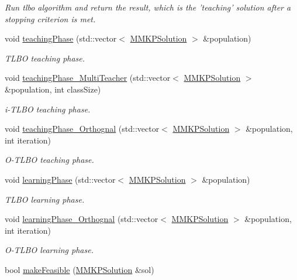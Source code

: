 \begin{DoxyCompactItemize}
\begin{DoxyCompactList}\small\item\em Run tlbo algorithm and return the result, which is the 'teaching' solution after a stopping criterion is met. \end{DoxyCompactList}\item 
void \hyperlink{class_m_m_k_p___t_l_b_o_ab18aa71ce62a00663cedb6d7d8db6f38}{teaching\+Phase} (std\+::vector$<$ \hyperlink{class_m_m_k_p_solution}{M\+M\+K\+P\+Solution} $>$ \&population)
\begin{DoxyCompactList}\small\item\em T\+L\+B\+O teaching phase. \end{DoxyCompactList}\item 
void \hyperlink{class_m_m_k_p___t_l_b_o_a0d3fe3e2570a79a3bd2f29aef3977d7e}{teaching\+Phase\+\_\+\+Multi\+Teacher} (std\+::vector$<$ \hyperlink{class_m_m_k_p_solution}{M\+M\+K\+P\+Solution} $>$ \&population, int class\+Size)
\begin{DoxyCompactList}\small\item\em i-\/\+T\+L\+B\+O teaching phase. \end{DoxyCompactList}\item 
void \hyperlink{class_m_m_k_p___t_l_b_o_a6377147784c758b4f8e782b37f86be73}{teaching\+Phase\+\_\+\+Orthognal} (std\+::vector$<$ \hyperlink{class_m_m_k_p_solution}{M\+M\+K\+P\+Solution} $>$ \&population, int iteration)
\begin{DoxyCompactList}\small\item\em O-\/\+T\+L\+B\+O teaching phase. \end{DoxyCompactList}\item 
void \hyperlink{class_m_m_k_p___t_l_b_o_ae230bdd3c27355b3b89c23ba3de2cb29}{learning\+Phase} (std\+::vector$<$ \hyperlink{class_m_m_k_p_solution}{M\+M\+K\+P\+Solution} $>$ \&population)
\begin{DoxyCompactList}\small\item\em T\+L\+B\+O learning phase. \end{DoxyCompactList}\item 
void \hyperlink{class_m_m_k_p___t_l_b_o_ad79c49be3f52a25879df07ad70af65d8}{learning\+Phase\+\_\+\+Orthognal} (std\+::vector$<$ \hyperlink{class_m_m_k_p_solution}{M\+M\+K\+P\+Solution} $>$ \&population, int iteration)
\begin{DoxyCompactList}\small\item\em O-\/\+T\+L\+B\+O learning phase. \end{DoxyCompactList}\item 
\hypertarget{class_m_m_k_p___t_l_b_o_a2edb2de3b8f71f7df34812be858e752a}{bool \hyperlink{class_m_m_k_p___t_l_b_o_a2edb2de3b8f71f7df34812be858e752a}{make\+Feasible} (\hyperlink{class_m_m_k_p_solution}{M\+M\+K\+P\+Solution} \&sol)}\label{class_m_m_k_p___t_l_b_o_a2edb2de3b8f71f7df34812be858e752a}


\end{DoxyCompactItemize}
